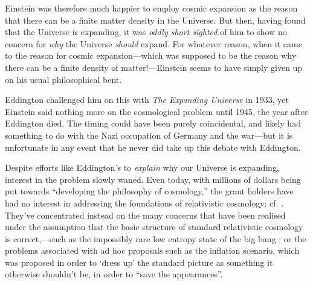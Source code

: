 \documentclass[12 pt]{article}
\begin{document}
Einstein was therefore much happier to employ cosmic expansion as the reason that there can be a finite matter density in the Universe. But then, having found that the Universe is expanding, it was \textit{oddly short sighted} of him to show no concern for \textit{why} the Universe \textit{should} expand. For whatever reason, when it came to the reason for cosmic expansion---which was supposed to be the reason why there can be a finite density of matter!---Einstein seems to have simply given up on his usual philosophical bent. 

Eddington challenged him on this with \textit{The Expanding Universe} in 1933, yet Einstein said nothing more on the cosmological problem until 1945, the year after Eddington died. The timing could have been purely coincidental, and likely had something to do with the Nazi occupation of Germany and the war---but it is unfortunate in any event that he never did take up this debate with Eddington.

Despite efforts like Eddington's to \textit{explain} why our Universe is expanding, interest in the problem slowly waned. Even today, with millions of dollars being put towards ``developing the philosophy of cosmology,'' the grant holders have had no interest in addressing the foundations of relativistic cosmology; cf. \citet{Benetreau2013}. They've concentrated instead on the many concerns that have been realised under the assumption that the basic structure of standard relativistic cosmology is correct,---such as the impossibly rare low entropy state of the big bang \citep{Penrose2005}; or the problems associated with ad hoc proposals such as the inflation scenario, which was proposed in order to `dress up' the standard picture as something it otherwise shouldn't be, in order to ``save the appearances''.
\end{document}
